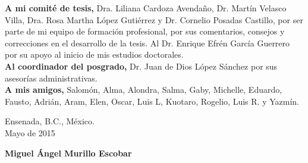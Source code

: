 {\textbf{A mi comité de tesis,} Dra. Liliana Cardoza Avendaño, Dr. Martín Velasco Villa, Dra. Rosa Martha López Gutiérrez y Dr. Cornelio Posadas Castillo, por ser parte de mi equipo de formación profesional, por sus comentarios, consejos y correcciones en el desarrollo de la tesis. Al Dr. Enrique Efrén García Guerrero por su apoyo al inicio de mis estudios doctorales. \\
  
\textbf{Al coordinador del posgrado,} Dr. Juan de Dios López Sánchez por sus asesorías administrativas.  \\
  
\textbf{A mis amigos,} Salomón, Alma, Alondra, Salma, Gaby, Michelle, Eduardo, Fausto, Adrián, Aram, Elen, Oscar, Luis L, Kuotaro, Rogelio, Luis R. y Yazmín. \\

\begin{flushleft}
Ensenada, B.C., México.\\
Mayo de 2015
\end{flushleft}

\begin{flushright}
\large{\textbf{Miguel Ángel Murillo Escobar}}
\end{flushright}


}



